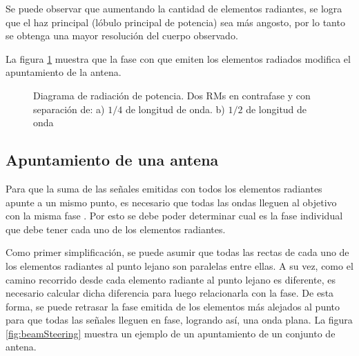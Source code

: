 Se puede observar que aumentando la cantidad de elementos radiantes, se logra que el haz principal (lóbulo principal de
potencia) sea más angosto, por lo tanto se obtenga una mayor resolución del cuerpo observado. 

La figura \ref{fig:directArrayPat} muestra que la fase con que emiten los elementos radiados modifica el apuntamiento de la 
antena.

\begin{figure}[H]
	\centering
	\caption{Diagrama de radiación de potencia. Dos RMs en contrafase y con separación de: a) $1/4$ de longitud de onda. b) $1/2$ 
		de longitud de onda}
	\label{fig:directArrayPat}
\end{figure}


\subsection{Apuntamiento de una antena}\label{ssec:beamSteering}

Para que la suma de las señales emitidas con todos los elementos radiantes apunte a un mismo punto, es necesario que
todas las ondas lleguen al objetivo con la misma fase . Por esto se debe poder determinar cual es la fase individual que
debe tener cada uno de los elementos radiantes.

Como primer simplificación, se puede asumir que todas las rectas de cada uno de los elementos radiantes al punto lejano son
paralelas entre ellas. A su vez, como el camino recorrido desde cada elemento radiante al punto lejano es diferente, es
necesario calcular dicha diferencia para luego relacionarla con la fase. De esta forma, se puede retrasar la fase emitida de
los elementos más alejados al punto para que todas las señales lleguen en fase, logrando así, una onda plana. La figura 
\ref{fig:beamSteering} muestra un ejemplo de un apuntamiento de un conjunto de antena.

